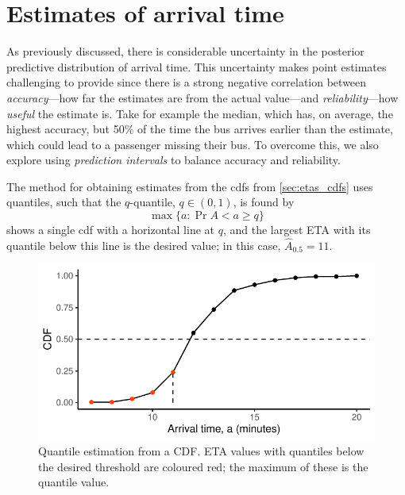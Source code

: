 \section{Estimates of arrival time}
\label{sec:eta_estimates}

As previously discussed, there is considerable uncertainty in the posterior predictive distribution of arrival time. This uncertainty makes point estimates challenging to provide since there is a strong negative correlation between \emph{accuracy}---how far the estimates are from the actual value---and \emph{reliability}---how \emph{useful} the estimate is. Take for example the median, which has, on average, the highest accuracy, but 50\% of the time the bus arrives earlier than the estimate, which could lead to a passenger missing their bus. To overcome this, we also explore using \emph{prediction intervals} to balance accuracy and reliability.

The method for obtaining estimates from the \glspl{cdf} from \cref{sec:etas_cdfs} uses quantiles, such that the $q$-quantile, $q\in(0,1)$, is found by
\begin{equation}
\label{eq:eta_calc_quantile}
\max\{a : \Pr{A < a} \geq q\}
\end{equation}
 shows a single \gls{cdf} with a horizontal line at $q$, and the largest ETA with its quantile below this line is the desired value; in this case, $\hat A_{0.5} = 11$.


\begin{knitrout}\small
{}\color{fgcolor}\begin{figure}

{\centering \includegraphics[width=.6\textwidth]{figure/eta_calc_quantile-1} 

}

\caption[Quantile estimation from a CDF]{Quantile estimation from a CDF. ETA values with quantiles below the desired threshold are coloured red; the maximum of these is the quantile value.}\label{fig:eta_calc_quantile}
\end{figure}


\end{knitrout}




